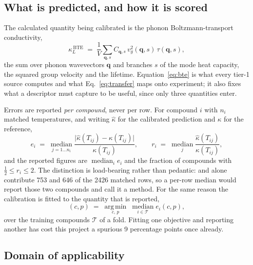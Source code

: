 \subsection{What is predicted, and how it is scored}
\label{sec:definitions}

The calculated quantity being calibrated is the phonon Boltzmann-transport conductivity,
%
\begin{equation}
  \kappa_L^{\,\mathrm{BTE}} \;=\; \frac{1}{V}\sum_{\mathbf{q},s}
    C_{\mathbf{q},s}\, v_{g}^{2}(\mathbf{q},s)\, \tau(\mathbf{q},s),
  \label{eq:bte}
\end{equation}
%
the sum over phonon wavevectors $\mathbf{q}$ and branches $s$ of the mode heat capacity, the squared
group velocity and the lifetime. Equation~\eqref{eq:bte} is what every tier-1 source computes and
what Eq.~\eqref{eq:transfer} maps onto experiment; it also fixes what a descriptor must capture to
be useful, since only three quantities enter.

Errors are reported \emph{per compound}, never per row. For compound $i$ with $n_i$ matched
temperatures, and writing $\hat{\kappa}$ for the calibrated prediction and $\kappa$ for the
reference,
%
\begin{equation}
  e_i \;=\; \operatorname*{median}_{j=1\ldots n_i}
    \frac{\bigl|\hat{\kappa}(T_{ij}) - \kappa(T_{ij})\bigr|}{\kappa(T_{ij})},
  \qquad
  r_i \;=\; \operatorname*{median}_{j} \frac{\hat{\kappa}(T_{ij})}{\kappa(T_{ij})},
  \label{eq:err}
\end{equation}
%
and the reported figures are $\operatorname{median}_i e_i$ and the fraction of compounds with
$\tfrac{1}{2} \le r_i \le 2$. The distinction is load-bearing rather than pedantic:  and
 alone contribute \num{753} and \num{646} of the \num{2426} matched rows, so a per-row
median would report those two compounds and call it a method. For the same reason the calibration
is fitted to the quantity that is reported,
%
\begin{equation}
  (c, p) \;=\; \operatorname*{arg\,min}_{c,\,p}\;
    \operatorname*{median}_{i \in \mathcal{T}} e_i(c, p),
  \label{eq:fit}
\end{equation}
%
over the training compounds $\mathcal{T}$ of a fold. Fitting one objective and reporting another has
cost this project a spurious \num{9} percentage points once already.

\subsection{Domain of applicability}
\label{sec:domain}

